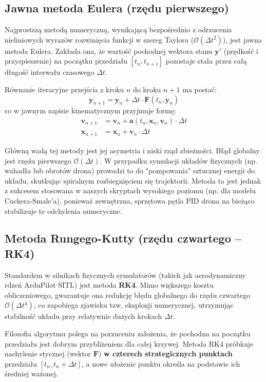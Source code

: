 \subsection{Jawna metoda Eulera (rzędu pierwszego)}
Najprostszą metodą numeryczną, wynikającą bezpośrednio z odrzucenia nieliniowych wyrazów rozwinięcia funkcji w szereg Taylora ($\mathcal{O}(\Delta t^2)$), jest jawna metoda Eulera. Zakłada ona, że wartość pochodnej wektora stanu $\mathbf{y}'$ (prędkość i przyspieszenie) na początku przedziału $[t_n, t_{n+1}]$ pozostaje stała przez całą długość interwału czasowego $\Delta t$.

Równanie iteracyjne przejścia z kroku $n$ do kroku $n+1$ ma postać:
\begin{equation}
    \mathbf{y}_{n+1} = \mathbf{y}_n + \Delta t \cdot \mathbf{F}(t_n, \mathbf{y}_n)
\end{equation}
co w jawnym zapisie kinematycznym przyjmuje formę:
\begin{align}
    \mathbf{v}_{n+1} &= \mathbf{v}_n + \mathbf{a}(t_n, \mathbf{x}_n, \mathbf{v}_n) \cdot \Delta t \\
    \mathbf{x}_{n+1} &= \mathbf{x}_n + \mathbf{v}_n \cdot \Delta t
\end{align}

Główną wadą tej metody jest jej asymetria i niski rząd zbieżności. Błąd globalny jest rzędu pierwszego $\mathcal{O}(\Delta t)$. W przypadku symulacji układów fizycznych (np. wahadła lub obrotów drona) prowadzi to do "pompowania" sztucznej energii do układu, skutkując spiralnym rozbiegnięciem się trajektorii. Metoda ta jest jednak z sukcesem stosowana w naszych skryptach wysokiego poziomu (np. dla modelu Cuckera-Smale'a), ponieważ zewnętrzna, sprzętowa pętla PID drona na bieżąco stabilizuje te odchylenia numeryczne.


\subsection{Metoda Rungego-Kutty (rzędu czwartego -- RK4)}
Standardem w silnikach fizycznych symulatorów (takich jak aerodynamiczny rdzeń ArduPilot SITL) jest metoda \textbf{RK4}. Mimo większego kosztu obliczeniowego, gwarantuje ona redukcję błędu globalnego do rzędu czwartego $\mathcal{O}(\Delta t^4)$, co zapobiega zjawisku tzw. eksplozji numerycznej, utrzymując stabilność układu przy relatywnie dużych krokach $\Delta t$.

Filozofia algorytmu polega na porzuceniu założenia, że pochodna na początku przedziału jest dobrym przybliżeniem dla całej krzywej. Metoda RK4 próbkuje nachylenie stycznej (wektor $\mathbf{F}$) \textbf{w czterech strategicznych punktach} przedziału $[t_n, t_n + \Delta t]$, a nowe ułożenie punktu określa na podstawie ich średniej ważonej.

